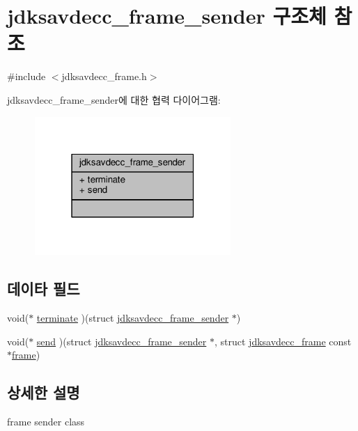 \hypertarget{structjdksavdecc__frame__sender}{}\section{jdksavdecc\+\_\+frame\+\_\+sender 구조체 참조}
\label{structjdksavdecc__frame__sender}


{\ttfamily \#include $<$jdksavdecc\+\_\+frame.\+h$>$}



jdksavdecc\+\_\+frame\+\_\+sender에 대한 협력 다이어그램\+:
\nopagebreak
\begin{figure}[H]
\begin{center}
\leavevmode
\includegraphics[width=211pt]{structjdksavdecc__frame__sender__coll__graph}
\end{center}
\end{figure}
\subsection*{데이타 필드}
\begin{DoxyCompactItemize}
\item 
void($\ast$ \hyperlink{structjdksavdecc__frame__sender_ae0dab1fa8921638cb5f3f79898a6ad30}{terminate} )(struct \hyperlink{structjdksavdecc__frame__sender}{jdksavdecc\+\_\+frame\+\_\+sender} $\ast$)
\item 
void($\ast$ \hyperlink{structjdksavdecc__frame__sender_aaba8425858e063d1c81af62be9044449}{send} )(struct \hyperlink{structjdksavdecc__frame__sender}{jdksavdecc\+\_\+frame\+\_\+sender} $\ast$, struct \hyperlink{structjdksavdecc__frame}{jdksavdecc\+\_\+frame} const $\ast$\hyperlink{gst__avb__playbin_8c_ac8e710e0b5e994c0545d75d69868c6f0}{frame})
\end{DoxyCompactItemize}


\subsection{상세한 설명}
frame sender class 

